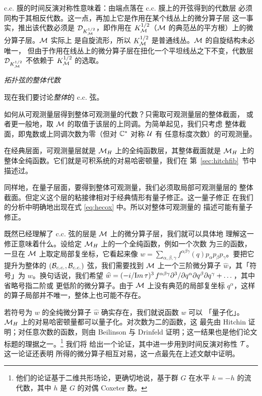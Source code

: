 c.c. 膜的时间反演对称性意味着：由端点落在 c.c. 膜上的开弦得到的代数层
必须同构于其相反代数。这一点，再加上它是作用在某个线丛上的微分算子层
这一事实，推出该代数必须是 ${\cal D}_{K_{\EUM}^{1/2}}$，即作用在
$K_{\EUM}^{1/2}$（$\M$ 的典范丛的平方根）上的微分算子层。$\M$ 实际上
是自旋流形，所以 $K_\M^{1/2}$ 是普通线丛。$\M$ 的自旋结构未必唯一，
但由于作用在线丛上的微分算子层在扭化一个平坦线丛之下不变，代数层
${\cal D}_{K_\EUM^{1/2}}$ 不依赖于 $K_{\EUM}^{1/2}$ 的选取。

\par\medskip\emph{拓扑弦的整体代数}

现在我们要讨论\emph{整体}的 c.c. 弦。

如何从可观测量层得到整体可观测量的代数？只需取可观测量层的整体截面，
或者更一般地，取 $\M$ 的取值于该层的上同调。为简单起见，我们只考虑
整体截面，即鬼数或上同调次数为零（但对 $\Bbb{C}^*$ 对称 ${\cal U}$ 有
任意标度次数）的可观测量。

在经典层面，可观测量层就是 $\MH$ 上的全纯函数层，其整体截面就是
$\MH$ 上的整体全纯函数。它们就是可积系统的对易哈密顿量，我们在
第~\ref{sec:hitchfib}~节中描述过。

同样地，在量子层面，要得到整体可观测量，我们必须取局部可观测量层的
整体截面。但定义这个层的粘接律相对于经典情形有量子修正。这一量子修正
在我们的分析中明确地出现在式 \eqref{eq:hecox} 中。所以对整体可观测量的
描述可能有量子修正。

既然已经理解了 c.c. 弦的层是 $\M$ 上的微分算子层，我们就可以具体地
理解这一修正意味着什么。设给定 $\MH$ 上的一个全纯函数，例如一个次数
为三的函数，一旦在 $\M$ 上取定局部复坐标，它看起来像
$w=\sum_{\alpha,\beta,\gamma} f^{\alpha\beta\gamma}(q)p_\alpha
p_\beta p_\gamma$。要把它提升为整体的 $({\cal
B}_{c.c.},{\cal B}_{c.c.})$ 弦，我们需要找到 $\M$ 上一个三阶微分算子
$\hat w$，其「符号」为 $w$。换句话说，我们希望 $\hat w=(-i/{\rm
Im}\,\tau)^3\,f^{\alpha\beta\gamma}\partial^3 /\partial
q^\alpha\partial q^\beta\partial q^\gamma+\dots$，其中省略号指二阶或
更低阶的微分算子。由于 $\M$ 上没有典范的局部复坐标 $q^\alpha$，这样
的算子局部并不唯一，整体上也可能不存在。

若符号为 $w$ 的全纯微分算子 $\hat w$ 确实存在，我们就说函数 $w$ 可以
「量子化」。$\MH$ 上的对易哈密顿量都可以量子化。对次数为二的函数，这
最先由 Hitchin \cite{ref141} 证明；对任意次数的函数，则由 Beilinson 与
Drinfeld \cite{ref5} 证明；这一结果也是他们论文标题的理据之一。\footnote{他们的论证基于二维共形场论，更确切地说，基于群 $G$
在水平 $k=-h$ 的流代数，其中 $h$ 是 $G$ 的对偶 Coxeter 数。} 我们将
给出一个论证，其中进一步用到时间反演对称性 ${\EUT}$。这一论证还表明
所得的微分算子相互对易，这一点最先在上述文献中证明。


